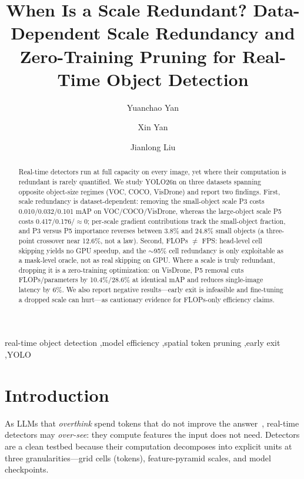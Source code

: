 \documentclass[3p]{elsarticle}
\begin{document}
\begin{frontmatter}
\title{When Is a Scale Redundant? Data-Dependent Scale Redundancy and Zero-Training Pruning for Real-Time Object Detection}
\author[aff1]{Yuanchao Yan}
\author[aff1]{Xin Yan}
\author[aff1]{Jianlong Liu}
\address[aff1]{Department of Artificial Intelligence and Computational Science, Science and Technology College, Gannan Normal University, Ganzhou 341000, China}

\begin{abstract}
Real-time detectors run at full capacity on every image, yet where their computation is redundant is rarely quantified. We study YOLO26n on three datasets spanning opposite object-size regimes (VOC, COCO, VisDrone) and report two findings. First, scale redundancy is dataset-dependent: removing the small-object scale P3 costs 0.010/0.032/0.101 mAP on VOC/COCO/VisDrone, whereas the large-object scale P5 costs 0.417/0.176/$\approx$0; per-scale gradient contributions track the small-object fraction, and P3 versus P5 importance reverses between 3.8\% and 24.8\% small objects (a three-point crossover near 12.6\%, not a law). Second, FLOPs $\neq$ FPS: head-level cell skipping yields no GPU speedup, and the $\sim$95\% cell redundancy is only exploitable as a mask-level oracle, not as real skipping on GPU. Where a scale is truly redundant, dropping it is a zero-training optimization: on VisDrone, P5 removal cuts FLOPs/parameters by 10.4\%/28.6\% at identical mAP and reduces single-image latency by 6\%. We also report negative results---early exit is infeasible and fine-tuning a dropped scale can hurt---as cautionary evidence for FLOPs-only efficiency claims.
\end{abstract}

\begin{keyword}
real-time object detection \sep model efficiency \sep spatial token pruning \sep early exit \sep YOLO
\end{keyword}
\end{frontmatter}

\section{Introduction}
As LLMs that \emph{overthink} spend tokens that do not improve the answer~\cite{wei2022chain,feng2025efficient}, real-time detectors may \emph{over-see}: they compute features the input does not need. Detectors are a clean testbed because their computation decomposes into explicit units at three granularities---grid cells (tokens), feature-pyramid scales, and model checkpoints.
\end{document}
